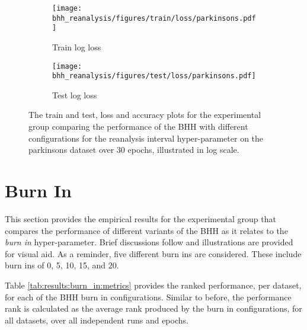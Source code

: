 \begin{figure}[htb]
	\begin{subfigure}{0.5\textwidth}
		\centering
		\texttt{[image: bhh\_reanalysis/figures/train/loss/parkinsons.pdf]}
		\caption{Train log loss}
		\label{fig:results:reanalysis:figures:loss:train:parkinsons}
	\end{subfigure}
	\begin{subfigure}{0.5\textwidth}
		\centering
		\texttt{[image: bhh\_reanalysis/figures/test/loss/parkinsons.pdf]}
		\caption{Test log loss}
		\label{fig:results:reanalysis:figures:loss:test:parkinsons}
	\end{subfigure}
	\par\bigskip
	\caption{The train and test, loss and accuracy plots for the experimental group comparing the performance of the \acs{BHH} with different configurations for the reanalysis interval hyper-parameter on the parkinsons dataset over 30 epochs, illustrated in log scale.}
	\label{fig:results:reanalysis:figures:parkinsons}
\end{figure}


\section{Burn In}\label{sec:results:burn_in}

This section provides the empirical results for the experimental group that compares the performance of different variants of the \acs{BHH} as it relates to the \textit{burn in} hyper-parameter. Brief discussions follow and illustrations are provided for visual aid. As a reminder, five different burn ins are considered. These include burn ins of 0, 5, 10, 15, and 20.

Table \ref{tab:results:burn_in:metrics} provides the ranked performance, per dataset, for each of the \acs{BHH} burn in configurations. Similar to before, the performance rank is calculated as the average rank produced by the burn in configurations, for all datasets, over all independent runs and epochs.

